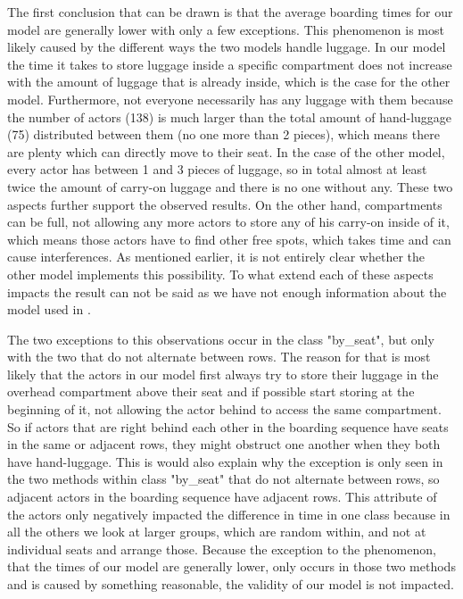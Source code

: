\documentclass[11pt]{article}
\begin{document}
The first conclusion that can be drawn is that the average boarding times for our model are generally lower with only a few exceptions. This phenomenon is most likely caused by the different ways the two models handle luggage. In our model the time it takes to store luggage inside a specific compartment does not increase with the amount of luggage that is already inside, which is the case for the other model. Furthermore, not everyone necessarily has any luggage with them because the number of actors (138) is much larger than the total amount of hand-luggage (75) distributed between them (no one more than 2 pieces), which means there are plenty which can directly move to their seat. In the case of the other model, every actor has between 1 and 3 pieces of luggage, so in total almost at least twice the amount of carry-on luggage and there is no one without any. These two aspects further support the observed results. On the other hand, compartments can be full, not allowing any more actors to store any of his carry-on inside of it, which means those actors have to find other free spots, which takes time and can cause interferences.  As mentioned earlier, it is not entirely clear whether the other model implements this possibility. To what extend each of these aspects impacts the result can not be said as we have not enough information about the model used in \cite{beus}. 
	
The two exceptions to this observations occur in the class "by\_seat", but only with the two that do not alternate between rows. The reason for that is most likely that the actors in our model first always try to store their luggage in the overhead compartment above their seat and if possible start storing at the beginning of it, not allowing the actor behind to access the same compartment. So if actors that are right behind each other in the boarding sequence have seats in the same or adjacent rows, they might obstruct one another when they both have hand-luggage. This is would also explain why the exception is only seen in the two methods within class "by\_seat" that do not alternate between rows, so adjacent actors in the boarding sequence have adjacent rows. This attribute of the actors only negatively impacted the difference in time in one class because in all the others we look at larger groups, which are random within, and not at individual seats and arrange those. Because the exception to the phenomenon, that the times of our model are generally lower, only occurs in those two methods and is caused by something reasonable, the validity of our model is not impacted. 
\end{document}
